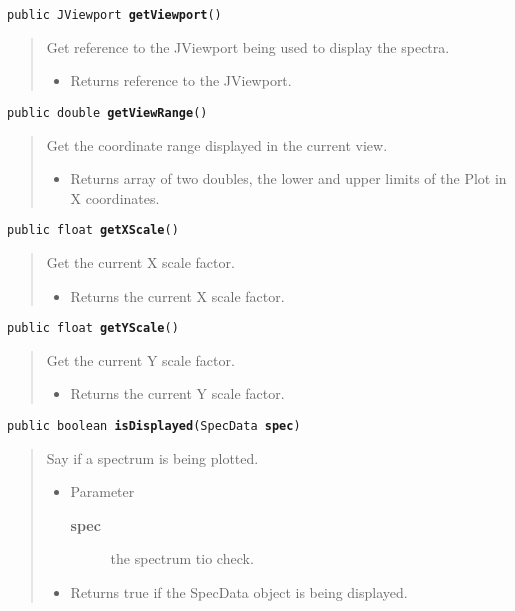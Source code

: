 \documentclass[twoside,11pt,nolof]{starlink}
\providecommand{\method}[1]{\texttt{#1}}
\newenvironment{desc}{\begin{quote}}{\end{quote}}
\begin{document}
\method{public JViewport \textbf{getViewport}()\label{l176}\label{l177}}
\begin{desc}Get reference to the JViewport being used to display the
 spectra.
\begin{itemize}
\item{Returns reference to the JViewport. }
\end{itemize}
\end{desc}

\method{public double \textbf{getViewRange}()\label{l178}\label{l179}}
\begin{desc}Get the coordinate range displayed in the current view.
\begin{itemize}
\item{Returns array of two doubles, the lower and upper limits of the
        Plot in X coordinates. }
\end{itemize}
\end{desc}

\method{public float \textbf{getXScale}()\label{l180}\label{l181}}
\begin{desc}Get the current X scale factor.
\begin{itemize}
\item{Returns the current X scale factor. }
\end{itemize}
\end{desc}

\method{public float \textbf{getYScale}()\label{l182}\label{l183}}
\begin{desc}Get the current Y scale factor.
\begin{itemize}
\item{Returns the current Y scale factor. }
\end{itemize}
\end{desc}

\method{public boolean \textbf{isDisplayed}(\texttt{SpecData} \textbf{spec})\label{l184}\label{l185}}
\begin{desc}Say if a spectrum is being plotted.
\begin{itemize}
\item{Parameter
  \begin{description}
   \item[\textbf{spec}]{the spectrum tio check.}
  \end{description}}
\end{itemize}
\begin{itemize}
\item{Returns true if the SpecData object is being displayed. }
\end{itemize}
\end{desc}
\end{document}
